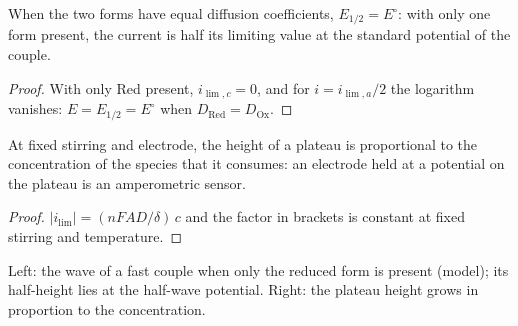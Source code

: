 \begin{corollary}\label{cor:b2:current-potential-curves:half-wave}
When the two forms have equal diffusion coefficients, $E_{1/2} = E^\circ$: with
only one form present, the current is half its limiting value at the standard
potential of the couple.
\end{corollary}

\begin{proof}
With only Red present, $i_{\lim,c} = 0$, and for $i = i_{\lim,a}/2$ the logarithm
vanishes: $E = E_{1/2} = E^\circ$ when $D_{\text{Red}} = D_{\text{Ox}}$.
\end{proof}

\begin{proposition}\label{prop:b2:current-potential-curves:plateau}
At fixed stirring and electrode, the height of a plateau is proportional to the
concentration of the species that it consumes: an electrode held at a
potential on the plateau is an amperometric sensor.
\end{proposition}

\begin{proof}
$|i_{\lim}| = (nFAD/\delta)\,c$ and the factor in brackets is constant at fixed
stirring and temperature.
\end{proof}

\begin{omfigure}
\hfill
{}

{\small Left: the wave of a fast couple when only the reduced form is present
(model); its half-height lies at the half-wave potential. Right: the plateau
height grows in proportion to the concentration.}
\end{omfigure}

